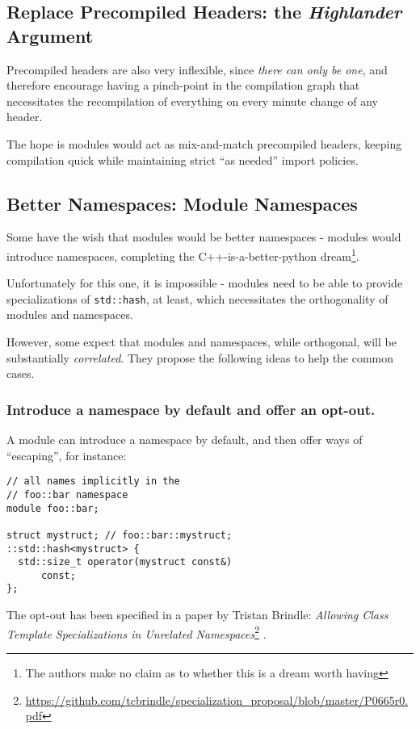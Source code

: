 \documentclass[reqno]{article}
\begin{document}
\subsection{Replace Precompiled Headers: the \emph{Highlander} Argument}

Precompiled headers are also very inflexible, since \emph{there can only be
one}, and therefore encourage having a pinch-point in the compilation graph that
necessitates the recompilation of everything on every minute change of any
header.

The hope is modules would act as mix-and-match precompiled headers, keeping
compilation quick while maintaining strict “as needed” import policies.


\subsection{Better Namespaces: Module Namespaces}

Some have the wish that modules would be better namespaces - modules would
introduce namespaces, completing the C++-is-a-better-python dream\footnote{The
authors make no claim as to whether this is a dream worth having}.

Unfortunately for this one, it is impossible - modules need to be able to
provide specializations of \texttt{std::hash}, at least, which necessitates the
orthogonality of modules and namespaces.

However, some expect that modules and namespaces, while orthogonal, will be
substantially \emph{correlated}. They propose the following ideas to help the
common cases.


\subsubsection{Introduce a namespace by default and offer an opt-out.}

A module can introduce a namespace by default, and then offer ways of
“escaping”, for instance:

\begin{verbatim}
// all names implicitly in the
// foo::bar namespace
module foo::bar;

struct mystruct; // foo::bar::mystruct;
::std::hash<mystruct> {
  std::size_t operator(mystruct const&)
      const;
};
\end{verbatim}

The opt-out has been specified in a paper by Tristan Brindle: \emph{Allowing
Class Template Specializations in Unrelated Namespaces}\footnote{
\url{https://github.com/tcbrindle/specialization_proposal/blob/master/P0665r0.pdf}}
.
\end{document}
